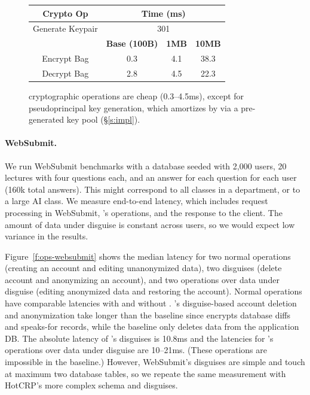 \begin{figure}[t]
\centering
\begin{tabular}{ c c c c }
    \textbf{Crypto Op} & \multicolumn{3}{c}{\textbf{Time (ms)}}\\
\hline
    Generate Keypair & \multicolumn{3}{c}{301}\\
\hline
    & \textbf{Base (100B)} & \textbf{1MB} & \textbf{10MB}\\
    Encrypt Bag & 0.3 & 4.1 & 38.3\\
    Decrypt Bag & 2.8 & 4.5 & 22.3\\
\end{tabular}
  \caption{\sys cryptographic operations are cheap (0.3--4.5ms), except for
    pseudoprincipal key generation, which \sys amortizes by via a pre-generated
    key pool (\S\ref{s:impl}).}
  \label{f:opstats}
\end{figure}

\paragraph{WebSubmit.}
%
We run WebSubmit benchmarks with a database seeded with 2,000 users, 20
lectures with four questions each, and an answer for each question for
each user (160k total answers).
%
This might correspond to all classes in a department, or to a large AI class.
%
We measure end-to-end latency, which includes request processing in WebSubmit,
\sys's operations, and the response to the client.
%
The amount of data under disguise is constant across users, so we would expect
low variance in the results.
%

%
Figure~\ref{f:ops-websubmit} shows the median latency for two normal operations
(creating an account and editing unanonymized data), two disguises (delete account
and anonymizing an account), and two operations over data under disguise (editing
anonymized data and restoring the account).
%
Normal operations have comparable latencies with and without \sys.
%
\sys's disguise-based account deletion and anonymization take longer than the
baseline since \sys encrypts database diffs and speaks-for records, while
the baseline only deletes data from the application DB.
%
The absolute latency of \sys's disguises is 10.8ms and the latencies for
\sys's operations over data under disguise are 10--21ms.
%
(These operations are impossible in the baseline.)
%
However, WebSubmit's disguises are simple and touch at maximum two database
tables, so we repeate the same measurement with HotCRP's more complex schema and
disguises.
%

